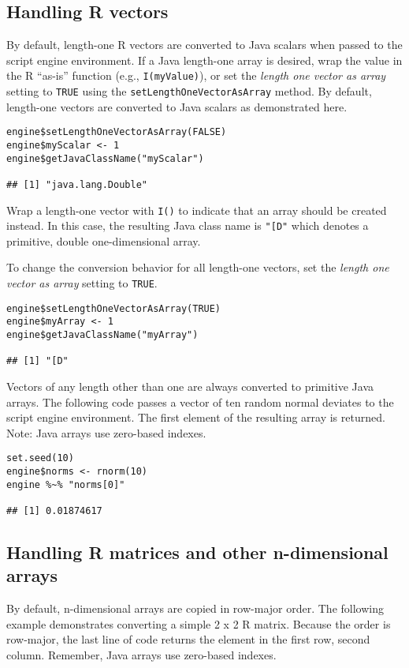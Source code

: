 \documentclass[
article,
11pt, %
a4paper, %
oneside, %
headinclude,footinclude, %
]{scrartcl}
\theoremstyle{definition} %
\theoremstyle{plain} %
\theoremstyle{remark} %
\newcommand{\code}[1]{\texttt{#1}}
\newcommand{\strong}[1]{\texorpdfstring{{\normalfont\fontseries{b}\selectfont #1}}{#1}}
\begin{document}
\hypertarget{handling-r-vectors}{}
\subsection{Handling R vectors}

By default, length-one R vectors are converted to Java scalars when passed to the script engine environment. If a Java length-one array is desired, wrap the value in the R ``as-is'' function (e.g., \code{I(myValue)}), or set the \textit{length one vector as array} setting to \code{TRUE} using the \code{setLengthOneVectorAsArray} method. By default, length-one vectors are converted to Java scalars as demonstrated here.

\begin{verbatim}
engine$setLengthOneVectorAsArray(FALSE)
engine$myScalar <- 1
engine$getJavaClassName("myScalar")

## [1] "java.lang.Double"
\end{verbatim}
Wrap a length-one vector with \code{I()} to indicate that an array should be created instead. In this case, the resulting Java class name is \code{"[D"} which denotes a primitive, double one-dimensional array.

To change the conversion behavior for all length-one vectors, set the \textit{length one vector as array} setting to \code{TRUE}.
\begin{verbatim}
engine$setLengthOneVectorAsArray(TRUE)
engine$myArray <- 1
engine$getJavaClassName("myArray")

## [1] "[D"
\end{verbatim}

Vectors of any length other than one are always converted to primitive Java arrays. The following code passes a vector of ten random normal deviates to the script engine environment. The first element of the resulting array is returned. \strong{Note:} Java arrays use zero-based indexes.

\begin{verbatim}
set.seed(10)
engine$norms <- rnorm(10)
engine %~% "norms[0]"

## [1] 0.01874617
\end{verbatim}

\subsection{Handling R matrices and other n-dimensional arrays}

By default, n-dimensional arrays are copied in row-major order. The following example demonstrates converting a simple 2 x 2 R matrix. Because the order is row-major, the last line of code returns the element in the first row, second column. Remember, Java arrays use zero-based indexes.
\end{document}
